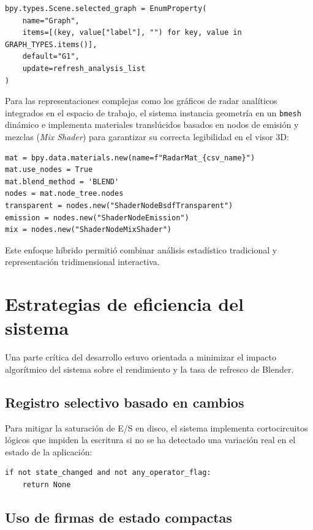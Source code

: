 \begin{verbatim}
bpy.types.Scene.selected_graph = EnumProperty(
    name="Graph",
    items=[(key, value["label"], "") for key, value in GRAPH_TYPES.items()],
    default="G1",
    update=refresh_analysis_list
)
\end{verbatim}

Para las representaciones complejas como los gráficos de radar analíticos integrados en el espacio de trabajo, el sistema instancia geometría en un \texttt{bmesh} dinámico e implementa materiales translúcidos basados en nodos de emisión y mezclas (\textit{Mix Shader}) para garantizar su correcta legibilidad en el visor 3D:

\begin{verbatim}
mat = bpy.data.materials.new(name=f"RadarMat_{csv_name}")
mat.use_nodes = True
mat.blend_method = 'BLEND'
nodes = mat.node_tree.nodes
transparent = nodes.new("ShaderNodeBsdfTransparent")
emission = nodes.new("ShaderNodeEmission")
mix = nodes.new("ShaderNodeMixShader")
\end{verbatim}

Este enfoque híbrido permitió combinar análisis estadístico tradicional y representación tridimensional interactiva.

\section{Estrategias de eficiencia del sistema}

Una parte crítica del desarrollo estuvo orientada a minimizar el impacto algorítmico del sistema sobre el rendimiento y la tasa de refresco de Blender.

\subsection{Registro selectivo basado en cambios}

Para mitigar la saturación de E/S en disco, el sistema implementa cortocircuitos lógicos que impiden la escritura si no se ha detectado una variación real en el estado de la aplicación:
\begin{verbatim}
if not state_changed and not any_operator_flag:
    return None
\end{verbatim}

\subsection{Uso de firmas de estado compactas}

